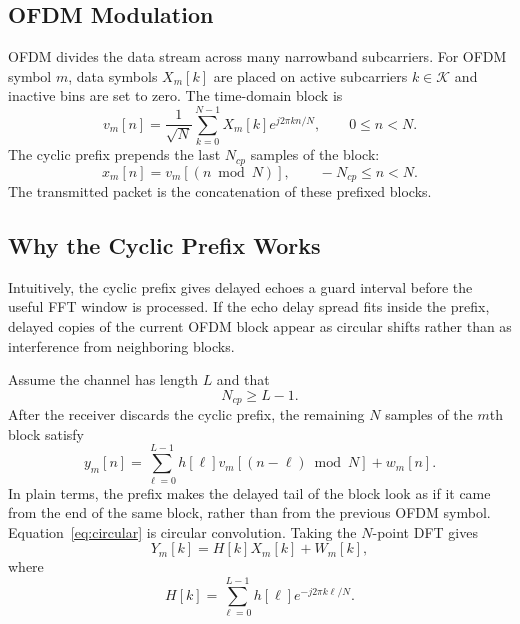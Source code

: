 \documentclass[conference]{IEEEtran}
\begin{document}
\subsection{OFDM Modulation}
OFDM divides the data stream across many narrowband subcarriers. For OFDM symbol $m$, data symbols $X_m[k]$ are placed on active subcarriers $k\in\mathcal{K}$ and inactive bins are set to zero. The time-domain block is
\begin{equation}
    v_m[n]=\frac{1}{\sqrt{N}}\sum_{k=0}^{N-1}X_m[k]e^{j2\pi kn/N},
    \qquad 0\leq n<N.
\end{equation}
The cyclic prefix prepends the last $N_{cp}$ samples of the block:
\begin{equation}
    x_m[n] = v_m[(n \bmod N)],\qquad -N_{cp}\leq n<N.
\end{equation}
The transmitted packet is the concatenation of these prefixed blocks.

\subsection{Why the Cyclic Prefix Works}

Intuitively, the cyclic prefix gives delayed echoes a guard interval before the useful FFT window is processed. If the echo delay spread fits inside the prefix, delayed copies of the current OFDM block appear as circular shifts rather than as interference from neighboring blocks.

Assume the channel has length $L$ and that
\begin{equation}
    N_{cp}\geq L-1.
\end{equation}
After the receiver discards the cyclic prefix, the remaining $N$ samples of the $m$th block satisfy
\begin{equation}
    y_m[n]=\sum_{\ell=0}^{L-1}h[\ell]v_m[(n-\ell)\bmod N]+w_m[n].
    \label{eq:circular}
\end{equation}
In plain terms, the prefix makes the delayed tail of the block look as if it came from the end of the same block, rather than from the previous OFDM symbol. Equation~\eqref{eq:circular} is circular convolution. Taking the $N$-point DFT gives
\begin{equation}
    Y_m[k]=H[k]X_m[k]+W_m[k],
    \label{eq:one_tap_model}
\end{equation}
where
\begin{equation}
    H[k]=\sum_{\ell=0}^{L-1}h[\ell]e^{-j2\pi k\ell/N}.
\end{equation}
\end{document}
